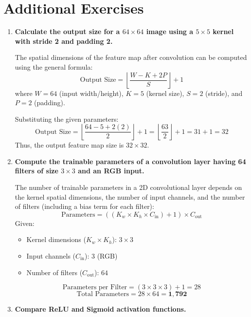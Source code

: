 \documentclass[11pt]{article}
\begin{document}
\section{Additional Exercises}
\begin{enumerate}
    \item \textbf{Calculate the output size for a $64\times64$ image using a $5\times5$ kernel with stride 2 and padding 2.}
    
    The spatial dimensions of the feature map after convolution can be computed using the general formula:
    \[
    \text{Output Size} = \left\lfloor \frac{W - K + 2P}{S} \right\rfloor + 1
    \]
    where $W = 64$ (input width/height), $K = 5$ (kernel size), $S = 2$ (stride), and $P = 2$ (padding).
    
    Substituting the given parameters:
    \[
    \text{Output Size} = \left\lfloor \frac{64 - 5 + 2(2)}{2} \right\rfloor + 1 = \left\lfloor \frac{63}{2} \right\rfloor + 1 = 31 + 1 = 32
    \]
    Thus, the output feature map size is \textbf{$32 \times 32$}.

    \item \textbf{Compute the trainable parameters of a convolution layer having 64 filters of size $3\times3$ and an RGB input.}
    
    The number of trainable parameters in a 2D convolutional layer depends on the kernel spatial dimensions, the number of input channels, and the number of filters (including a bias term for each filter):
    \[
    \text{Parameters} = \left( (K_w \times K_h \times C_{\text{in}}) + 1 \right) \times C_{\text{out}}
    \]
    Given:
    \begin{itemize}
        \item Kernel dimensions ($K_w \times K_h$): $3 \times 3$
        \item Input channels ($C_{\text{in}}$): $3$ (RGB)
        \item Number of filters ($C_{\text{out}}$): $64$
    \end{itemize}
    
    \[
    \text{Parameters per Filter} = (3 \times 3 \times 3) + 1 = 28
    \]
    \[
    \text{Total Parameters} = 28 \times 64 = \mathbf{1{,}792}
    \]

    \item \textbf{Compare ReLU and Sigmoid activation functions.}
    

\end{enumerate}
\end{document}
